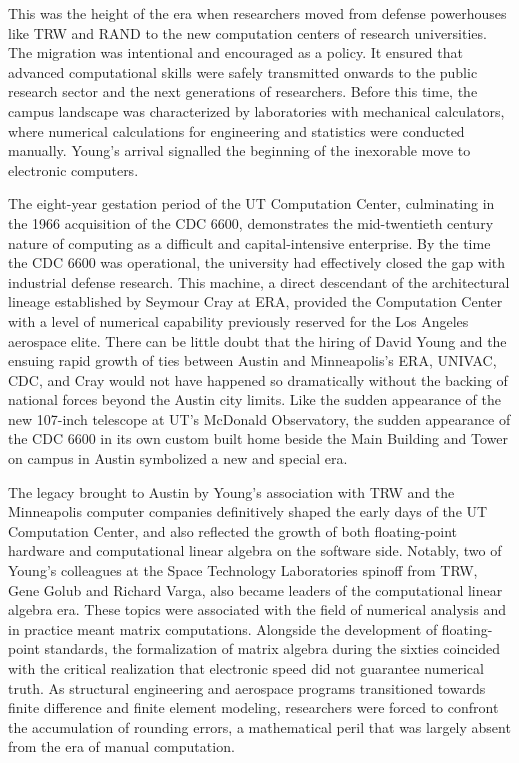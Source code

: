 This was the height of the era when researchers moved from defense powerhouses like TRW and RAND to the new computation centers of research universities. The migration was intentional and encouraged as a policy. It ensured that advanced computational skills were safely transmitted onwards to the public research sector and the next generations of researchers. Before this time, the campus landscape was characterized by laboratories with mechanical calculators, where numerical calculations for engineering and statistics were conducted manually. Young’s arrival signalled the beginning of the inexorable move to electronic computers. 

The eight-year gestation period of the UT Computation Center, culminating in the 1966 acquisition of the CDC 6600, demonstrates the mid-twentieth century nature of computing as a difficult and capital-intensive enterprise. By the time the CDC 6600 was operational, the university had effectively closed the gap with industrial defense research. This machine, a direct descendant of the architectural lineage established by Seymour Cray at ERA, provided the Computation Center with a level of numerical capability previously reserved for the Los Angeles aerospace elite. There can be little doubt that the hiring of David Young and the ensuing rapid growth of ties between Austin and Minneapolis’s ERA, UNIVAC, CDC, and Cray would not have happened so dramatically without the backing of national forces beyond the Austin city limits. Like the sudden appearance of the new 107-inch telescope at UT’s McDonald Observatory, the sudden appearance of the CDC 6600 in its own custom built home beside the Main Building and Tower on campus in Austin symbolized a new and special era. 

The legacy brought to Austin by Young’s association with TRW and the Minneapolis computer companies definitively shaped the early days of the UT Computation Center, and also reflected the growth of both floating-point hardware and computational linear algebra on the software side. Notably, two of Young’s colleagues at the Space Technology Laboratories spinoff from TRW, Gene Golub and Richard Varga, also became leaders of the computational linear algebra era. These topics were associated with the field of numerical analysis and in practice meant matrix computations. Alongside the development of floating-point standards, the formalization of matrix algebra during the sixties coincided with the critical realization that electronic speed did not guarantee numerical truth. As structural engineering and aerospace programs transitioned towards finite difference and finite element modeling, researchers were forced to confront the accumulation of rounding errors, a mathematical peril that was largely absent from the era of manual computation. 

